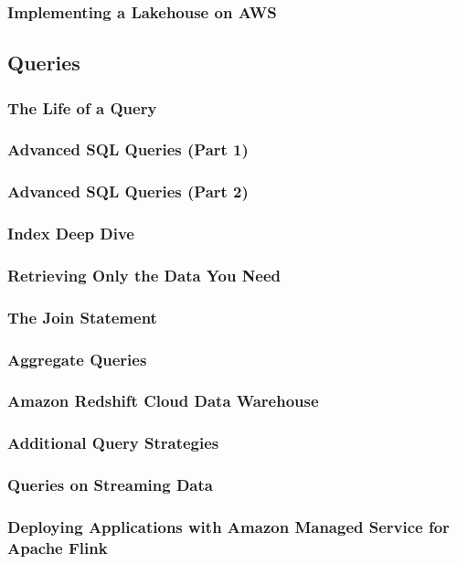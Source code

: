 \subsubsection{Implementing a Lakehouse on AWS}

\subsection{Queries}
\subsubsection{The Life of a Query}
\subsubsection{Advanced SQL Queries (Part 1)}
\subsubsection{Advanced SQL Queries (Part 2)}
\subsubsection{Index Deep Dive}
\subsubsection{Retrieving Only the Data You Need}
\subsubsection{The Join Statement}
\subsubsection{Aggregate Queries}
\subsubsection{Amazon Redshift Cloud Data Warehouse}
\subsubsection{Additional Query Strategies}
\subsubsection{Queries on Streaming Data}
\subsubsection{Deploying Applications with Amazon Managed Service for Apache Flink}
